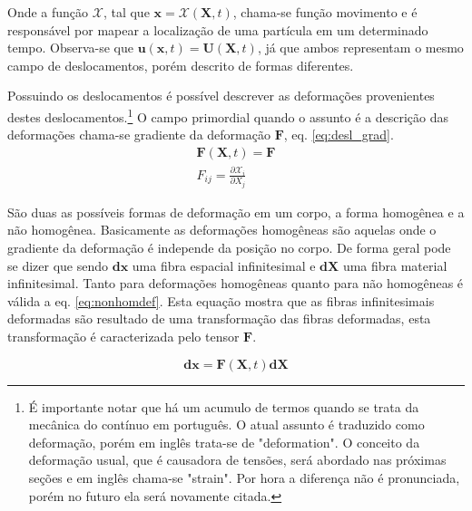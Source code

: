 Onde a função $ \mathcal{X} $, tal que $ \boldsymbol{x} = \mathcal{X}(\boldsymbol{X},t) $, chama-se função movimento e é responsável por mapear a localização de uma partícula em um determinado tempo. Observa-se que $ \boldsymbol{u}(\boldsymbol{x},t) =  \boldsymbol{U}(\boldsymbol{X},t)  $, já que ambos representam o mesmo campo de deslocamentos, porém descrito de formas diferentes. \par

Possuindo os deslocamentos é possível descrever as deformações provenientes destes deslocamentos.\footnote{É importante notar que há um acumulo de termos quando se trata da mecânica do contínuo em português. O atual assunto é traduzido como deformação, porém em inglês trata-se de "deformation". O conceito da deformação usual, que é causadora de tensões, será abordado nas próximas seções e em inglês chama-se "strain". Por hora a diferença não é pronunciada, porém no futuro ela será novamente citada.} O campo primordial quando o assunto é a descrição das deformações chama-se gradiente da deformação $ \boldsymbol{F} $, eq. \ref{eq:desl_grad}.
\begin{align}\label{eq:desl_grad}
    \boldsymbol{F}(\boldsymbol{X},t) = \boldsymbol{F} \\
    F_{ij} = \frac{\partial \mathcal{X}_i}{\partial X_j}
\end{align}

São duas as possíveis formas de deformação em um corpo, a forma homogênea e a não homogênea. Basicamente as deformações homogêneas são aquelas onde o gradiente da deformação é independe da posição no corpo. De forma geral pode se dizer que sendo $ \boldsymbol{dx} $ uma fibra espacial infinitesimal e $ \boldsymbol{dX} $ uma fibra material infinitesimal. Tanto para deformações homogêneas quanto para não homogêneas é válida a eq. \ref{eq:nonhomdef}. Esta equação mostra que as fibras infinitesimais deformadas são resultado de uma transformação das fibras deformadas, esta transformação é caracterizada pelo tensor $\boldsymbol{F}$.

\begin{equation}
    \boldsymbol{dx} = \boldsymbol{F}(\boldsymbol{X},t) \boldsymbol{dX}
    \label{eq:nonhomdef}
\end{equation}



